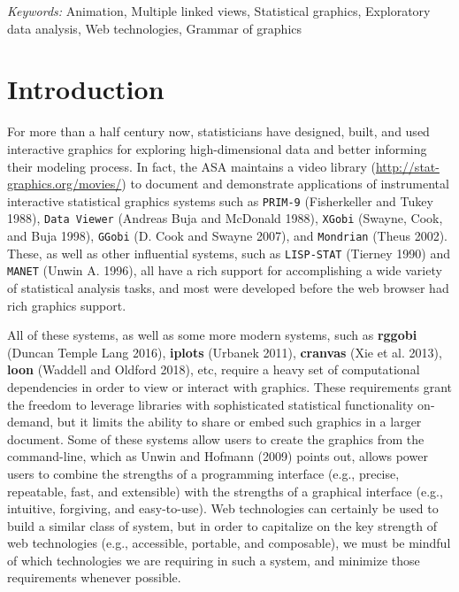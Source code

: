 \documentclass[12pt,]{article}
\theoremstyle{definition}
\theoremstyle{definition}
\theoremstyle{definition}
\theoremstyle{remark}
\begin{document}
\noindent
{\it Keywords:}  Animation, Multiple linked views, Statistical graphics, Exploratory data
analysis, Web technologies, Grammar of graphics
\vfill

\newpage
{} %


\hypertarget{intro}{%
\section{Introduction}\label{intro}}

For more than a half century now, statisticians have designed, built,
and used interactive graphics for exploring high-dimensional data and
better informing their modeling process. In fact, the ASA maintains a
video library (\url{http://stat-graphics.org/movies/}) to document and
demonstrate applications of instrumental interactive statistical
graphics systems such as \texttt{PRIM-9} (Fisherkeller and Tukey 1988),
\texttt{Data\ Viewer} (Andreas Buja and McDonald 1988), \texttt{XGobi}
(Swayne, Cook, and Buja 1998), \texttt{GGobi} (D. Cook and Swayne 2007),
and \texttt{Mondrian} (Theus 2002). These, as well as other influential
systems, such as \texttt{LISP-STAT} (Tierney 1990) and \texttt{MANET}
(Unwin A. 1996), all have a rich support for accomplishing a wide
variety of statistical analysis tasks, and most were developed before
the web browser had rich graphics support.

All of these systems, as well as some more modern systems, such as
\textbf{rggobi} (Duncan Temple Lang 2016), \textbf{iplots} (Urbanek
2011), \textbf{cranvas} (Xie et al. 2013), \textbf{loon} (Waddell and
Oldford 2018), etc, require a heavy set of computational dependencies in
order to view or interact with graphics. These requirements grant the
freedom to leverage libraries with sophisticated statistical
functionality on-demand, but it limits the ability to share or embed
such graphics in a larger document. Some of these systems allow users to
create the graphics from the command-line, which as Unwin and Hofmann
(2009) points out, allows power users to combine the strengths of a
programming interface (e.g., precise, repeatable, fast, and extensible)
with the strengths of a graphical interface (e.g., intuitive, forgiving,
and easy-to-use). Web technologies can certainly be used to build a
similar class of system, but in order to capitalize on the key strength
of web technologies (e.g., accessible, portable, and composable), we
must be mindful of which technologies we are requiring in such a system,
and minimize those requirements whenever possible.
\end{document}
